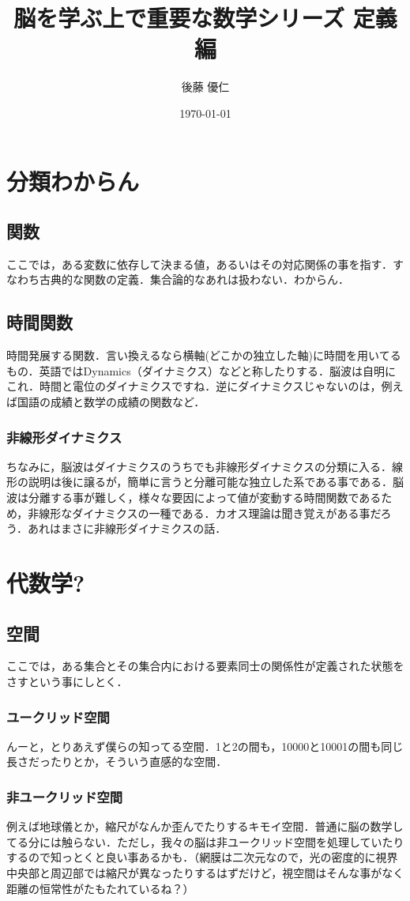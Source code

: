 \documentclass[11pt,a4paper]{jreport}
\title{脳を学ぶ上で重要な数学シリーズ 定義編}
\author{後藤 優仁}
\date{\today}
\begin{document}
\maketitle
%
%
\tableofcontents

\chapter{分類わからん}
\section{関数}
ここでは，ある変数に依存して決まる値，あるいはその対応関係の事を指す．すなわち古典的な関数の定義．集合論的なあれは扱わない．わからん．
\section{時間関数}
時間発展する関数．言い換えるなら横軸(どこかの独立した軸)に時間を用いてるもの．英語ではDynamics（ダイナミクス）などと称したりする．脳波は自明にこれ．時間と電位のダイナミクスですね．逆にダイナミクスじゃないのは，例えば国語の成績と数学の成績の関数など．
\subsection{非線形ダイナミクス}
ちなみに，脳波はダイナミクスのうちでも非線形ダイナミクスの分類に入る．線形の説明は後に譲るが，簡単に言うと分離可能な独立した系である事である．脳波は分離する事が難しく，様々な要因によって値が変動する時間関数であるため，非線形なダイナミクスの一種である．カオス理論は聞き覚えがある事だろう．あれはまさに非線形ダイナミクスの話．

\chapter{代数学?}
\section{空間}
ここでは，ある集合とその集合内における要素同士の関係性が定義された状態をさすという事にしとく．
\subsection{ユークリッド空間}
んーと，とりあえず僕らの知ってる空間．1と2の間も，10000と10001の間も同じ長さだったりとか，そういう直感的な空間．
\subsection{非ユークリッド空間}
例えば地球儀とか，縮尺がなんか歪んでたりするキモイ空間．普通に脳の数学してる分には触らない．ただし，我々の脳は非ユークリッド空間を処理していたりするので知っとくと良い事あるかも．（網膜は二次元なので，光の密度的に視界中央部と周辺部では縮尺が異なったりするはずだけど，視空間はそんな事がなく距離の恒常性がたもたれているね？）
\end{document}
